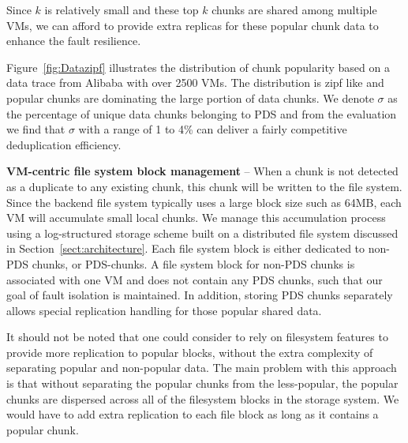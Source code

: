 Since $k$ is relatively small and these top $k$ chunks are shared among multiple VMs, 
we can afford to provide extra replicas for these popular chunk data to enhance the fault resilience.

Figure~\ref{fig:Datazipf} illustrates the distribution of chunk popularity based on a data trace from Alibaba with over 2500 VMs.
The distribution is zipf like and popular chunks are dominating the large portion of data chunks.
We denote $\sigma$ as the percentage of unique data chunks belonging to PDS and from the evaluation we find that
$\sigma$ with a range of 1 to 4\% can deliver a fairly competitive deduplication efficiency.

\textbf{VM-centric file system block management} --
When a chunk is not detected as a duplicate to any existing chunk, this chunk will be written
to the file system. Since the backend file system typically uses a large block size such as 64MB, each VM will 
accumulate small local chunks. We manage this accumulation process using a log-structured storage scheme built
on a distributed file system discussed in Section~\ref{sect:architecture}.
Each file system block is either dedicated to non-PDS chunks, or PDS-chunks.
A file system block for non-PDS chunks is associated with one VM and does not contain
any PDS chunks, such that our goal of fault isolation is maintained.
In addition, storing PDS chunks separately allows special replication handling for those popular shared data. 

It should not be noted that one could consider 
to rely on filesystem features to provide more replication to popular
blocks, without the extra complexity of separating popular and non-popular
data. The main problem with this  approach is that without separating the
popular chunks from the less-popular, the popular chunks are dispersed across
all of the filesystem blocks in the storage system.  We would
have to add extra replication to each file block as long as it contains a popular chunk.



